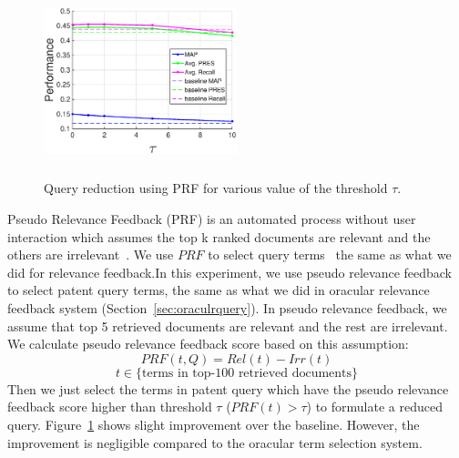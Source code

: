 \begin{figure}[t!]
   \centering
   \includegraphics[width=0.50\textwidth,height=55mm]{figs/prf.eps}
   \caption{Query reduction using PRF for various value of the threshold $\tau$.}   
   \label{fig:prf} 
\end{figure}
Pseudo Relevance Feedback (PRF) is an automated process without user interaction which assumes the top k ranked documents are relevant and the others are irrelevant~\citep{Baeza-Yates2011}. We use $\mathit{PRF}$ to select query terms~\cite{maxwell2013compact} the same as what we did for relevance feedback.In this experiment, we use pseudo relevance feedback to select patent query terms, the same as what we did in oracular relevance feedback system (Section~\ref{sec:oraculrquery}). In pseudo relevance feedback, we assume that top 5 retrieved documents are relevant and the rest are irrelevant. We calculate pseudo relevance feedback score based on this assumption:  
\begin{equation}
PRF(t,Q)=Rel(t)-Irr(t) 
 \label{eq:score}
\end{equation}
\vspace*{-2ex}
\begin{displaymath}t\in \lbrace \mbox{terms in top-100 retrieved documents}\rbrace\end{displaymath}
Then we just select the terms in patent query which have the pseudo relevance feedback score higher than threshold $\tau$ ($PRF(t)>\tau$) to formulate a reduced query. Figure~\ref{fig:prf} shows slight improvement over the baseline. However, the improvement is negligible compared to the oracular term selection system.
